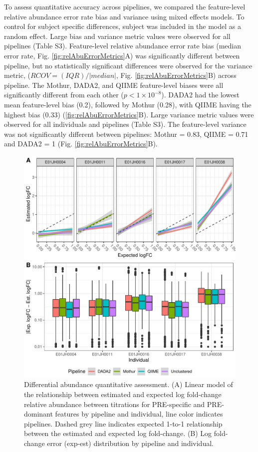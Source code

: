 \documentclass[linenumbers]{bmcart}
\begin{document}
To assess quantitative accuracy across pipelines, we compared the feature-level relative
abundance error rate bias and variance
using mixed effects models. To control for subject specific differences, 
subject was included in the model as a random effect.
Large bias and variance metric values were
observed for all pipelines (Table S3).
Feature-level relative abundance error rate bias (median error rate, Fig.
\ref{fig:relAbuErrorMetrics}A) was significantly different between
pipeline, but no statistically significant differences were observed
for the variance metric, (\(RCOV=(IQR)/|median|\), Fig.
\ref{fig:relAbuErrorMetrics}B) across pipeline. The Mothur, DADA2,
and QIIME feature-level biases were all significantly different from
each other (\(p < 1\times 10^{-8}\)). DADA2 had the lowest mean
feature-level bias (0.2), followed by Mothur (0.28), with QIIME having the highest bias
(0.33) (\ref{fig:relAbuErrorMetrics}B). Large variance metric values
were observed for all individuals and pipelines (Table S3). The feature-level variance was not
significantly different between pipelines: Mothur = 0.83, QIIME = 0.71
and DADA2 = 1 (Fig. \ref{fig:relAbuErrorMetrics}B).


\begin{figure}
\centering
\includegraphics{logFCerror-1.pdf}
\caption{\label{fig:logFCerror} Differential abundance quantitative assessment. (A) Linear model of the relationship between
estimated and expected log fold-change relative abundance between titrations for PRE-specific and
PRE-dominant features by pipeline and individual, line color indicates
pipelines. Dashed grey line indicates expected 1-to-1 relationship
between the estimated and expected log fold-change. (B) Log fold-change
error (\textbar{}exp-est\textbar{}) distribution by pipeline and
individual.}
\end{figure}
\end{document}
